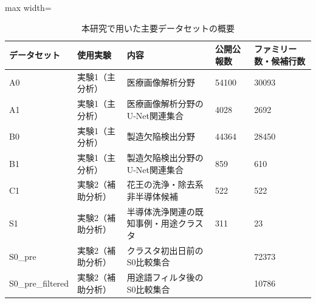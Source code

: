 \begin{table}[tbp]
\centering
\small
\caption{本研究で用いた主要データセットの概要}
\label{tab:dataset_summary_table}
\begin{adjustbox}{max width=\textwidth}
\begin{tabular}{lllll}
\toprule
データセット & 使用実験 & 内容 & 公開公報数 & ファミリー数・候補行数 \\
\midrule
A0 & 実験1（主分析） & 医療画像解析分野 & 54100 & 30093 \\
A1 & 実験1（主分析） & 医療画像解析分野のU-Net関連集合 & 4028 & 2692 \\
B0 & 実験1（主分析） & 製造欠陥検出分野 & 44364 & 28450 \\
B1 & 実験1（主分析） & 製造欠陥検出分野のU-Net関連集合 & 859 & 610 \\
C1 & 実験2（補助分析） & 花王の洗浄・除去系非半導体候補 & 522 & 522 \\
S1 & 実験2（補助分析） & 半導体洗浄関連の既知事例・用途クラスタ & 311 & 23 \\
S0\_pre & 実験2（補助分析） & クラスタ初出日前のS0比較集合 &  & 72373 \\
S0\_pre\_filtered & 実験2（補助分析） & 用途語フィルタ後のS0比較集合 &  & 10786 \\
\bottomrule
\end{tabular}
\end{adjustbox}
\end{table}
